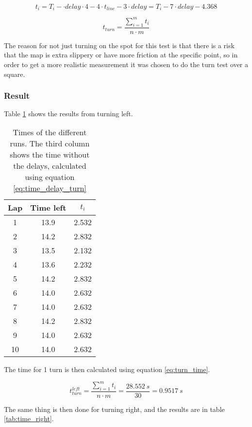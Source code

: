 \documentclass[a4paper,10pt]{article}
\begin{document}
\begin{equation} \label{eq:time_delay_turn}
t_i = T_i - \cdot delay\cdot 4 - 4\cdot t_{line} - 3 \cdot delay = T_i - 7 \cdot delay - 4.368
\end{equation}

\begin{equation} \label{eq:turn_time}
t_{turn} = \frac{\sum_{i=1}^m t_i}{n\cdot m}
\end{equation}

The reason for not just turning on the spot for this test is that there is a risk that the map is extra slippery or have more friction at the specific point, so in order to get a more realistic measurement it was chosen to do the turn test over a square. 

\subsubsection{Result}
Table \ref{tab:time_left} shows the results from turning left.
\begin{table} [H]
\centering
 \begin{tabular}{|c|c|c|}
  \hline Lap & Time left & $t_i$ \\ \hline
  1  & 13.9  & 2.532 \\  \hline
  2  & 14.2  & 2.832 \\  \hline
  3  & 13.5  & 2.132 \\  \hline
  4  & 13.6  & 2.232 \\  \hline
  5  & 14.2  & 2.832 \\  \hline
  6  & 14.0  & 2.632 \\  \hline
  7  & 14.0  & 2.632 \\  \hline
  8  & 14.2  & 2.832 \\  \hline
  9  & 14.0  & 2.632 \\  \hline
  10 & 14.0  & 2.632 \\ \hline
 \end{tabular}
 \caption{Times of the different runs. The third column shows the time without the delays, calculated using equation \ref{eq:time_delay_turn}}
 \label{tab:time_left}
\end{table}



The time for 1 turn is then calculated using equation \ref{eq:turn_time}.

$$
t_{turn}^{left} = \frac{\sum^{m}_{i=1}t_i}{n\cdot m} = \frac{28.552\ s}{30} = 0.9517\ s
$$

The same thing is then done for turning right, and the results are in table \ref{tab:time_right}.
\end{document}
